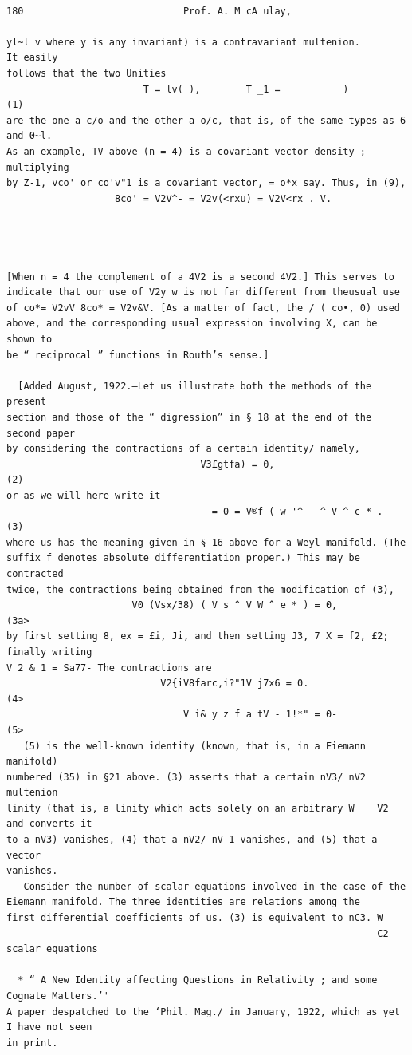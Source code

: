\documentclass[10pt]{article}
\begin{document}
\clearpage
\begin{verbatim}

180                            Prof. A. M cA ulay,

yl~l v where y is any invariant) is a contravariant multenion.             It easily
follows that the two Unities
                        T = lv( ),        T _1 =           )                      (1)
are the one a c/o and the other a o/c, that is, of the same types as 6 and 0~l.
As an example, TV above (n = 4) is a covariant vector density ; multiplying
by Z-1, vco' or co'v"1 is a covariant vector, = o*x say. Thus, in (9),
                   8co' = V2V^- = V2v(<rxu) = V2V<rx . V.




[When n = 4 the complement of a 4V2 is a second 4V2.] This serves to
indicate that our use of V2y w is not far different from theusual use
of co*= V2vV 8co* = V2v&V. [As a matter of fact, the / ( co•, 0) used
above, and the corresponding usual expression involving X, can be shown to
be “ reciprocal ” functions in Routh’s sense.]

  [Added August, 1922.—Let us illustrate both the methods of the present
section and those of the “ digression” in § 18 at the end of the second paper
by considering the contractions of a certain identity/ namely,
                                  V3£gtfa) = 0,                                   (2)
or as we will here write it
                                    = 0 = V®f ( w '^ - ^ V ^ c * .     (3)
where us has the meaning given in § 16 above for a Weyl manifold. (The
suffix f denotes absolute differentiation proper.) This may be contracted
twice, the contractions being obtained from the modification of (3),
                      V0 (Vsx/38) ( V s ^ V W ^ e * ) = 0,           (3a>
by first setting 8, ex = £i, Ji, and then setting J3, 7 X = f2, £2; finally writing
V 2 & 1 = Sa77- The contractions are
                           V2{iV8farc,i?"1V j7x6 = 0.                             (4>
                               V i& y z f a tV - 1!*" = 0-                        (5>
   (5) is the well-known identity (known, that is, in a Eiemann manifold)
numbered (35) in §21 above. (3) asserts that a certain nV3/ nV2 multenion
linity (that is, a linity which acts solely on an arbitrary W    V2 and converts it
to a nV3) vanishes, (4) that a nV2/ nV 1 vanishes, and (5) that a vector
vanishes.
   Consider the number of scalar equations involved in the case of the
Eiemann manifold. The three identities are relations among the
first differential coefficients of us. (3) is equivalent to nC3. W
                                                                 C2 scalar equations

  * “ A New Identity affecting Questions in Relativity ; and some Cognate Matters.’'
A paper despatched to the ‘Phil. Mag./ in January, 1922, which as yet I have not seen
in print.


\end{verbatim}
\end{document}
